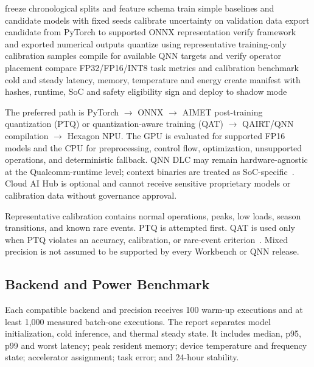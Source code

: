 \begin{algorithm}[t]
	\caption{Training and QIDK packaging}
	\label{alg:packaging}
	\begin{algorithmic}[1]
		\State freeze chronological splits and feature schema
		\State train simple baselines and candidate models with fixed seeds
		\State calibrate uncertainty on validation data
		\State export candidate from PyTorch to supported ONNX representation
		\State verify framework and exported numerical outputs
		\State quantize using representative training-only calibration samples
		\State compile for available QNN targets and verify operator placement
		\State compare FP32/FP16/INT8 task metrics and calibration
		\State benchmark cold and steady latency, memory, temperature and energy
		\State create manifest with hashes, runtime, SoC and safety eligibility
		\State sign and deploy to shadow mode
	\end{algorithmic}
\end{algorithm}

The preferred path is PyTorch $\rightarrow$ ONNX $\rightarrow$ AIMET post-training quantization (PTQ) or quantization-aware training (QAT) $\rightarrow$ QAIRT/QNN compilation $\rightarrow$ Hexagon NPU. The GPU is evaluated for supported FP16 models and the CPU for preprocessing, control flow, optimization, unsupported operations, and deterministic fallback. QNN DLC may remain hardware-agnostic at the Qualcomm-runtime level; context binaries are treated as SoC-specific~\cite{qualcomm_aihub_compile}. Cloud AI Hub is optional and cannot receive sensitive proprietary models or calibration data without governance approval.

Representative calibration contains normal operations, peaks, low loads, season transitions, and known rare events. PTQ is attempted first. QAT is used only when PTQ violates an accuracy, calibration, or rare-event criterion~\cite{qualcomm_aihub_quant}. Mixed precision is not assumed to be supported by every Workbench or QNN release.

\subsection{Backend and Power Benchmark}

Each compatible backend and precision receives 100 warm-up executions and at least 1,000 measured batch-one executions. The report separates model initialization, cold inference, and thermal steady state. It includes median, p95, p99 and worst latency; peak resident memory; device temperature and frequency state; accelerator assignment; task error; and 24-hour stability.

